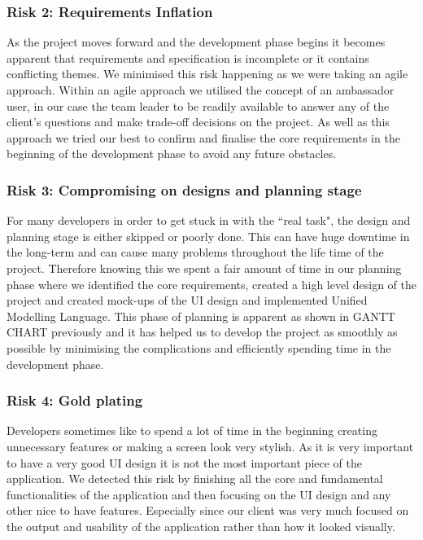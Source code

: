 \documentclass[12pt]{article}
\begin{document}
\subsubsection{Risk 2: Requirements Inflation}
As the project moves forward and the development phase begins it becomes apparent that requirements and specification is incomplete or it contains conflicting themes. We minimised this risk happening as we were taking an agile approach. Within an agile approach we utilised the concept of an ambassador user, in our case the team leader to be readily available to answer any of the client’s questions and make trade-off decisions on the project. As well as this approach we tried our best to confirm and finalise the core requirements in the beginning of the development phase to avoid any future obstacles. 

\subsubsection{Risk 3: Compromising on designs and planning stage}
For many developers in order to get stuck in with the ``real task", the design and planning stage is either skipped or poorly done. This can have huge downtime in the long-term and can cause many problems throughout the life time of the project. Therefore knowing this we spent a fair amount of time in our planning phase where we identified the core requirements, created a high level design of the project and created mock-ups of the UI design and implemented Unified Modelling Language. This phase of planning is apparent as shown in GANTT CHART previously and it has helped us to develop the project as smoothly as possible by minimising the complications and efficiently spending time in the development phase. 

\subsubsection{Risk 4: Gold plating}
Developers sometimes like to spend a lot of time in the beginning creating unnecessary features or making a screen look very stylish. As it is very important to have a very good UI design it is not the most important piece of the application. We detected this risk by finishing all the core and fundamental functionalities of the application and then focusing on the UI design and any other nice to have features. Especially since our client was very much focused on the output and usability of the application rather than how it looked visually. 
\end{document}
